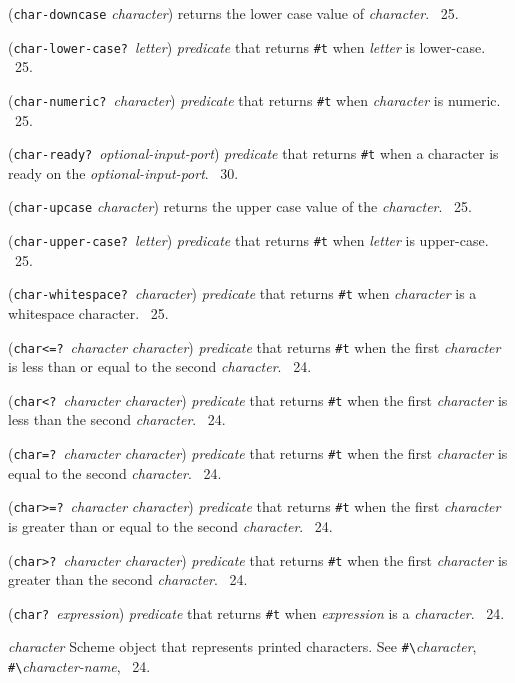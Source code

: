 \documentclass[10pt,twocolumn]{article}
\begin{document}
(\texttt{char-downcase} \emph{character}) returns the lower case value
of \emph{character}.  \RRRRRS~25.

(\texttt{char-lower-case?}\ \emph{letter}) \emph{predicate} that
returns \texttt{\#t} when \emph{letter} is lower-case.  \RRRRRS~25.

(\texttt{char-numeric?}\ \emph{character}) \emph{predicate} that
returns \texttt{\#t} when \emph{character} is numeric.  \RRRRRS~25.

(\texttt{char-ready?}\ \emph{optional-input-port}) \emph{predicate}
that returns \texttt{\#t} when a character is ready on the
\emph{optional-input-port}.  \RRRRRS~30.

(\texttt{char-upcase} \emph{character}) returns the upper case value
of the \emph{character}.  \RRRRRS~25.

(\texttt{char-upper-case?}\ \emph{letter}) \emph{predicate} that
returns \texttt{\#t} when \emph{letter} is upper-case.  \RRRRRS~25.

(\texttt{char-whitespace?}\ \emph{character}) \emph{predicate} that
returns \texttt{\#t} when \emph{character} is a whitespace character.
\RRRRRS~25.

(\texttt{char<=?}\ \emph{character} \emph{character}) \emph{predicate}
that returns \texttt{\#t} when the first \emph{character} is less than
or equal to the second \emph{character}.  \RRRRRS~24.

(\texttt{char<?}\ \emph{character} \emph{character}) \emph{predicate}
that returns \texttt{\#t} when the first \emph{character} is less than
the second \emph{character}.  \RRRRRS~24.

(\texttt{char=?}\ \emph{character} \emph{character}) \emph{predicate}
that returns \texttt{\#t} when the first \emph{character} is equal to
the second \emph{character}.  \RRRRRS~24.

(\texttt{char>=?}\ \emph{character} \emph{character}) \emph{predicate}
that returns \texttt{\#t} when the first \emph{character} is greater
than or equal to the second \emph{character}.  \RRRRRS~24.

(\texttt{char>?}\ \emph{character} \emph{character}) \emph{predicate}
that returns \texttt{\#t} when the first \emph{character} is greater
than the second \emph{character}.  \RRRRRS~24.

(\texttt{char?}\ \emph{expression}) \emph{predicate} that returns
\texttt{\#t} when \emph{expression} is a \emph{character}.
\RRRRRS~24.

\emph{character} Scheme object that represents printed characters.
See \texttt{\#\textbackslash}\emph{character},
\texttt{\#\textbackslash}\emph{character-name}, \RRRRRS~24.
\end{document}
